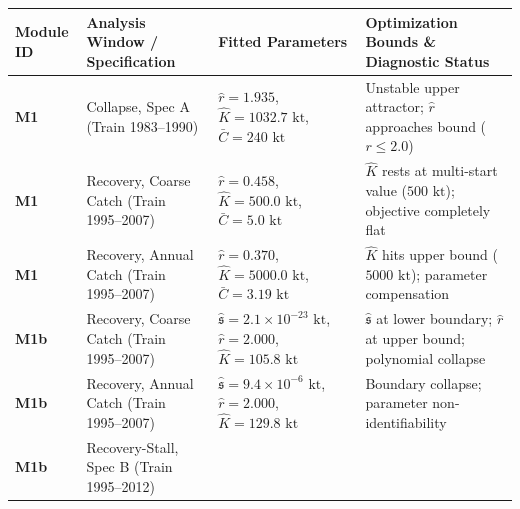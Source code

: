 \documentclass[11pt]{article}
\begin{document}
{\def\LTcaptype{none} %
\begin{longtable}[]{@{}
  >{\raggedright\arraybackslash}p{}
  >{\raggedright\arraybackslash}p{}
  >{\raggedright\arraybackslash}p{}
  >{\raggedright\arraybackslash}p{}@{}}
\toprule\noalign{}
\begin{minipage}[b]{\linewidth}\raggedright
Module ID
\end{minipage} & \begin{minipage}[b]{\linewidth}\raggedright
Analysis Window / Specification
\end{minipage} & \begin{minipage}[b]{\linewidth}\raggedright
Fitted Parameters
\end{minipage} & \begin{minipage}[b]{\linewidth}\raggedright
Optimization Bounds \& Diagnostic Status
\end{minipage} \\
\midrule\noalign{}
\endhead
\bottomrule\noalign{}
\endlastfoot
\textbf{M1} & Collapse, Spec A (Train 1983--1990) & \(\hat{r} = 1.935\),
\(\hat{K} = 1032.7\text{ kt}\), \(\bar{C} = 240\text{ kt}\) & Unstable
upper attractor; \(\hat{r}\) approaches bound (\(r \le 2.0\)) \\
\textbf{M1} & Recovery, Coarse Catch (Train 1995--2007) &
\(\hat{r} = 0.458\), \(\hat{K} = 500.0\text{ kt}\),
\(\bar{C} = 5.0\text{ kt}\) & \(\hat{K}\) rests at multi-start value
(\(500\text{ kt}\)); objective completely flat \\
\textbf{M1} & Recovery, Annual Catch (Train 1995--2007) &
\(\hat{r} = 0.370\), \(\hat{K} = 5000.0\text{ kt}\),
\(\bar{C} = 3.19\text{ kt}\) & \(\hat{K}\) hits upper bound
(\(5000\text{ kt}\)); parameter compensation \\
\textbf{M1b} & Recovery, Coarse Catch (Train 1995--2007) &
\(\hat{\mathfrak{s}} = 2.1 \times 10^{-23}\text{ kt}\),
\(\hat{r} = 2.000\), \(\hat{K} = 105.8\text{ kt}\) &
\(\hat{\mathfrak{s}}\) at lower boundary; \(\hat{r}\) at upper bound;
polynomial collapse \\
\textbf{M1b} & Recovery, Annual Catch (Train 1995--2007) &
\(\hat{\mathfrak{s}} = 9.4 \times 10^{-6}\text{ kt}\),
\(\hat{r} = 2.000\), \(\hat{K} = 129.8\text{ kt}\) & Boundary collapse;
parameter non-identifiability \\
\textbf{M1b} & Recovery-Stall, Spec B (Train 1995--2012) &

\end{longtable}}
\end{document}
